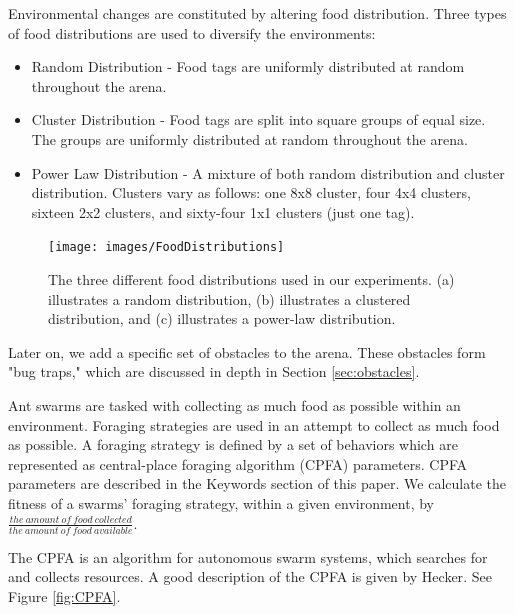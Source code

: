 \documentclass{acm_proc_article-sp}
\begin{document}
Environmental changes are constituted by altering food distribution. Three types of food distributions are used to diversify the environments:
\begin{itemize}
	\item Random Distribution - Food tags are uniformly distributed at random throughout the arena.

	\item Cluster Distribution - Food tags are split into square groups of equal size. The groups are uniformly distributed at random throughout the arena.

	\item Power Law Distribution - A mixture of both random distribution and cluster distribution. Clusters vary as follows: one 8x8 cluster, four 4x4 clusters, sixteen 2x2 clusters, and sixty-four 1x1 clusters (just one tag).
\end{itemize}

\begin{figure}[h]
\texttt{[image: images/FoodDistributions]}
\caption{The three different food distributions used in our experiments. (a) illustrates a random distribution, (b) illustrates a clustered distribution, and (c) illustrates a power-law distribution.} \label{fig:foodDistributions}
\end{figure}

Later on, we add a specific set of obstacles to the arena. These obstacles form "bug traps," which are discussed in depth in Section \ref{sec:obstacles}.

Ant swarms are tasked with collecting as much food as possible within an environment. Foraging strategies are used in an attempt to collect as much food as possible. A foraging strategy is defined by a set of behaviors which are represented as central-place foraging algorithm (CPFA) parameters. CPFA parameters are described in the Keywords section of this paper. We calculate the fitness of a swarms' foraging strategy, within a given environment, by $\frac{the\ amount\ of\ food\ collected}{the\ amount\ of\ food\ available}$. 

The CPFA is an algorithm for autonomous swarm systems, which searches for and collects resources. A good description of the CPFA is given by Hecker\cite{hecker:CPFA}. See Figure \ref{fig:CPFA}.
\end{document}
